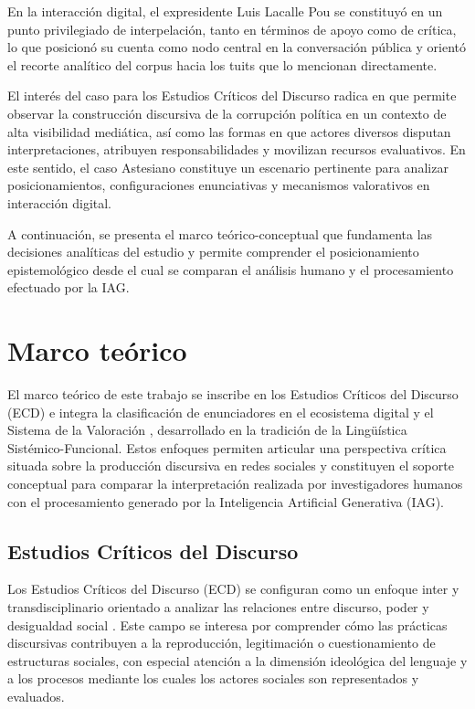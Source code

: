 \documentclass[spanish]{textolivre}
\begin{document}
En la interacción digital, el expresidente Luis Lacalle Pou se constituyó en un punto privilegiado de interpelación, tanto en términos de apoyo como de crítica, lo que posicionó su cuenta como nodo central en la conversación pública y orientó el recorte analítico del corpus hacia los tuits que lo mencionan directamente.

El interés del caso para los Estudios Críticos del Discurso radica en que permite observar la construcción discursiva de la corrupción política en un contexto de alta visibilidad mediática, así como las formas en que actores diversos disputan interpretaciones, atribuyen responsabilidades y movilizan recursos evaluativos. En este sentido, el caso Astesiano constituye un escenario pertinente para analizar posicionamientos, configuraciones enunciativas y mecanismos valorativos en interacción digital.

A continuación, se presenta el marco teórico-conceptual que fundamenta las decisiones analíticas del estudio y permite comprender el posicionamiento epistemológico desde el cual se comparan el análisis humano y el procesamiento efectuado por la IAG.

\section{Marco teórico}\label{sec-conduta}
El marco teórico de este trabajo se inscribe en los Estudios Críticos del Discurso (ECD) e integra la clasificación de enunciadores en el ecosistema digital \cite{muller2020estudios,gambetta2021desequilibrio,gambettaabella2024media} y el Sistema de la Valoración \cite{martin2005language}, desarrollado en la tradición de la Lingüística Sistémico-Funcional. Estos enfoques permiten articular una perspectiva crítica situada sobre la producción discursiva en redes sociales y constituyen el soporte conceptual para comparar la interpretación realizada por investigadores humanos con el procesamiento generado por la Inteligencia Artificial Generativa (IAG).


\subsection{Estudios Críticos del Discurso}\label{sec-fmt-manuscrito}
Los Estudios Críticos del Discurso (ECD) se configuran como un enfoque inter y transdisciplinario orientado a analizar las relaciones entre discurso, poder y desigualdad social \cite{fairclough1995critical,vandijk2008discourse,wodak2003metodos}. Este campo se interesa por comprender cómo las prácticas discursivas contribuyen a la reproducción, legitimación o cuestionamiento de estructuras sociales, con especial atención a la dimensión ideológica del lenguaje y a los procesos mediante los cuales los actores sociales son representados y evaluados.
\end{document}
